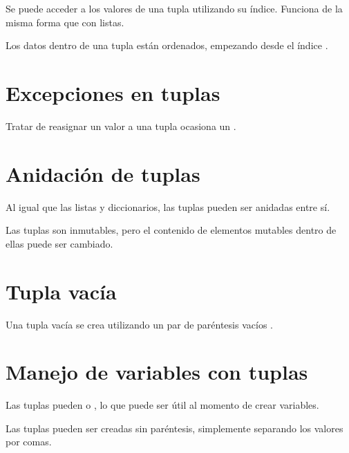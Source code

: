 Se puede acceder a los valores de una tupla utilizando su índice. Funciona de la misma forma que con listas.


Los datos dentro de una tupla están ordenados, empezando desde el índice .

\section{Excepciones en tuplas}

Tratar de reasignar un valor a una tupla ocasiona un .


\section{Anidación de tuplas}

Al igual que las listas y diccionarios, las tuplas pueden ser anidadas entre sí.\smallskip

Las tuplas son inmutables, pero el contenido de elementos mutables dentro de ellas puede ser cambiado.


\section{Tupla vacía}

Una tupla vacía se crea utilizando un par de paréntesis vacíos \ttt{()}.


\section{Manejo de variables con tuplas}

Las tuplas pueden  o , lo que puede ser útil al momento de crear variables.


Las tuplas pueden ser creadas sin paréntesis, simplemente separando los valores por comas.


